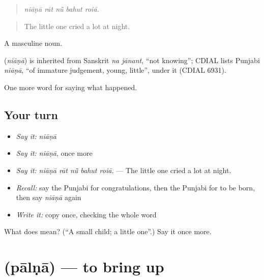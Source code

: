 \begin{quote}
    
\end{quote}

\begin{quote}
\emph{niāṇā rāt nū̃ bahut roiā.}
\end{quote}

\begin{quote}
The little one cried a lot at night.
\end{quote}

A masculine noun.

\begin{cousinweb}
\textbf{} (\emph{niāṇā}) is inherited from Sanskrit \emph{na jānant}, \textquotedblleft{}not knowing\textquotedblright{}; CDIAL lists Punjabi \emph{niāṇā}, \textquotedblleft{}of immature judgement, young, little\textquotedblright{}, under it (CDIAL 6931).
\end{cousinweb}

\begin{grammarlens}[title={What you've built}]
One more word for saying what happened.
\end{grammarlens}

\subsection*{Your turn}
\begin{itemize}
\raggedright
  \item \emph{Say it:} \emph{niāṇā}
  \item \emph{Say it:} \emph{niāṇā}, once more
  \item \emph{Say it:} \emph{niāṇā rāt nū̃ bahut roiā.} — The little one cried a lot at night.
  \item \emph{Recall:} say the Punjabi for congratulations, then the Punjabi for to be born, then say \emph{niāṇā} again
  \item \emph{Write it:} copy \textbf{} once, checking the whole word
\end{itemize}

\begin{tcolorbox}[breakable,colback=teal!4,colframe=teal!35!black,title={Before you move on}]
What does  mean? (\textquotedblleft{}A small child; a little one\textquotedblright{}.) Say it once more.
\end{tcolorbox}
\section[\texorpdfstring{\pa{ਪਾਲਣਾ} (pālṇā)}{ਪਾਲਣਾ (pālṇā)}]{ (pālṇā) — to bring up}

